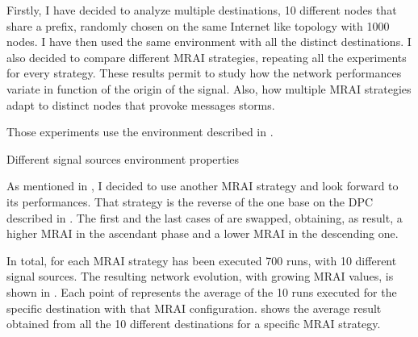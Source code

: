 Firstly, I have decided to analyze multiple destinations, \num{10}
different nodes that share a prefix, randomly chosen on the same Internet like
topology with \num{1000} nodes.
I have then used the same environment with all the distinct destinations.
I also decided to compare different \ac{MRAI} strategies, repeating all the experiments for
every strategy.
These results permit to study how the network performances variate in
function of the origin of the signal.
Also, how multiple \ac{MRAI} strategies adapt to distinct nodes that provoke
messages storms.

Those experiments use the environment described in .

\begin{table}[h]
	
	\caption{Different signal sources environment properties}
	\label{tbl:source_properties}
\end{table}

As mentioned in , I decided to use another
\ac{MRAI} strategy and look forward to its performances.
That strategy is the reverse of the one base on the \ac{DPC} described in
.
The first and the last cases of  are swapped, obtaining, as result, a
higher \ac{MRAI} in the ascendant phase and a lower \ac{MRAI} in the descending
one.

In total, for each \ac{MRAI} strategy has been executed \num{700} runs, with
\num{10} different signal sources.
The resulting network evolution, with growing \ac{MRAI} values, is shown in
.
Each point of  represents the average
of the \num{10} runs executed for the specific destination with that \ac{MRAI}
configuration.
 shows the average result
obtained from all the \num{10} different destinations for a specific \ac{MRAI}
strategy.

